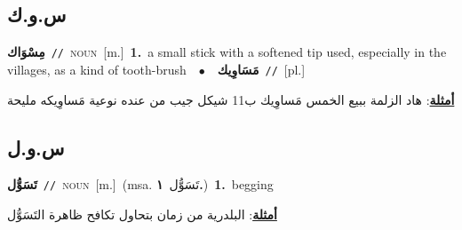\documentclass[10pt,a4paper,twoside]{article} %
\begin{document}
\begin{multicols}{2}
\vspace{-3mm}
\subsection*{\color{blue}\foreignlanguage{arabic}{س.و.ك}\color{blue}{}} 

{\setlength\topsep{0pt}\textbf{\foreignlanguage{arabic}{مِسْوَاك}}\ {\color{gray}\texttt{//}\color{black}}\ \textsc{noun}\ [m.]\ \textbf{1.}~a small stick with a softened tip used, especially in the villages, as a kind of tooth-brush\ \ $\bullet$\ \ \setlength\topsep{0pt}\textbf{\foreignlanguage{arabic}{مَسَاوِيك}}\ {\color{gray}\texttt{//}\color{black}}\ [pl.]\  \begin{flushright}\color{gray}\foreignlanguage{arabic}{\textbf{\underline{\foreignlanguage{arabic}{أمثلة}}}: هاد الزلمة ببيع الخمس مَساوِيك ب11 شيكل جيب من عنده نوعية مَساوِيكه مليحة}\end{flushright}\color{black}} \vspace{2mm}

\vspace{-3mm}
\subsection*{\color{blue}\foreignlanguage{arabic}{س.و.ل}\color{blue}{}} 

{\setlength\topsep{0pt}\textbf{\foreignlanguage{arabic}{تَسَوُّل}}\ {\color{gray}\texttt{//}\color{black}}\ \textsc{noun}\ [m.]\ \color{gray}(msa. \foreignlanguage{arabic}{تَسَوُّل}~\foreignlanguage{arabic}{\textbf{١.}})\color{black}\ \textbf{1.}~begging\  \begin{flushright}\color{gray}\foreignlanguage{arabic}{\textbf{\underline{\foreignlanguage{arabic}{أمثلة}}}: البلدرية من زمان بتحاول تكافح ظاهرة التَسَوُّل}\end{flushright}\color{black}} \vspace{2mm}


\end{multicols}
\end{document}
